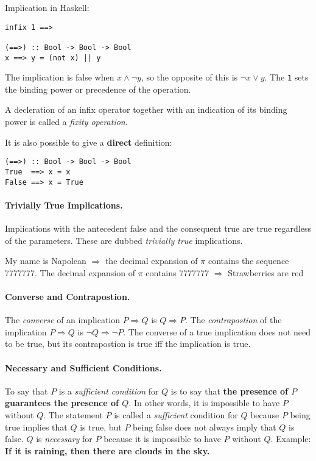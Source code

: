 \documentclass[11pt]{article}
\begin{document}
Implication in Haskell:
\begin{verbatim}
infix 1 ==>

(==>) :: Bool -> Bool -> Bool
x ==> y = (not x) || y
\end{verbatim}

The implication is false when $x \land \lnot y$, so the opposite of this is $\lnot x \lor y$. The \texttt{1} sets the binding power or precedence of the operation.

A decleration of an infix operator together with an indication of its binding power is called a \textit{fixity operation}.

It is also possible to give a \textbf{direct} definition:
\begin{verbatim}
(==>) :: Bool -> Bool -> Bool
True  ==> x = x
False ==> x = True
\end{verbatim}

\paragraph{Trivially True Implications.} Implications with the antecedent false and the consequent true are true regardless of the parameters. These are dubbed \textit{trivially true} implications.

My name is Napolean $\Rightarrow$ the decimal expansion of $\pi$ contains the sequence 7777777. \newline
The decimal expansion of $\pi$ contains 7777777 $\Rightarrow$ Strawberries are red

\paragraph{Converse and Contrapostion.} 

The \emph{converse} of an implication $P \Rightarrow Q$ is $Q \Rightarrow P$. The \emph{contrapostion} of the implication $P \Rightarrow Q$ is $\lnot Q \Rightarrow \lnot P$. The converse of a true implication does not need to be true, but its contrapostion is true iff the implication is true.

\paragraph{Necessary and Sufficient Conditions.} To say that $P$ is a \textit{sufficient condition} for $Q$ is to say that \textbf{the presence of $P$ guarantees the presence of $Q$}. In other words, it is impossible to have $P$ without $Q$. The statement $P$ is called a \emph{sufficient} condition for $Q$ because $P$ being true implies that $Q$ is true, but $P$ being false does not always imply that $Q$ is false. \newline $Q$ is \emph{necessary} for $P$ because it is impossible to have $P$ without $Q$. Example: \textbf{If it is raining, then there are clouds in the sky.}
\end{document}
